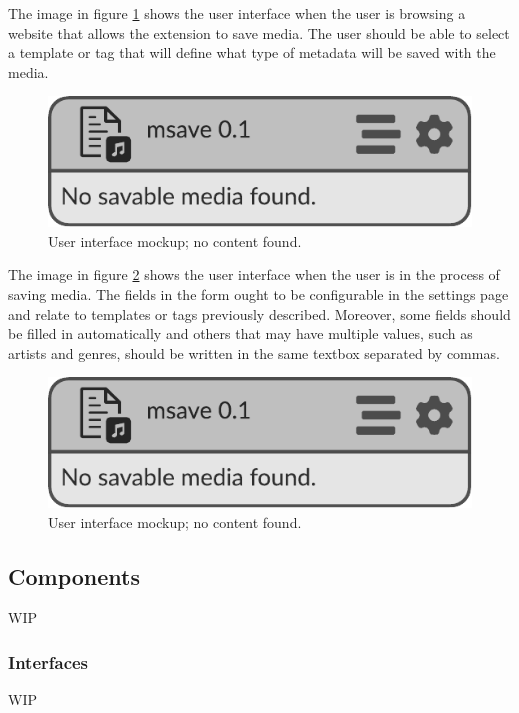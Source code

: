 The image in figure \ref{fig:ui-mockup-2} shows the user interface 
when the user is browsing a website that allows the extension to save media.
The user should be able to select a template or tag that will define 
what type of metadata will be saved with the media.
\begin{figure}[H]
    \centering
    \includegraphics[page=3]{resources/mockup-v0.1.pdf}
    \caption{User interface mockup; no content found.}
\label{fig:ui-mockup-2}
\end{figure}



The image in figure \ref{fig:ui-mockup-3} shows the user interface 
when the user is in the process of saving media.
The fields in the form ought to be configurable in the settings page and relate to templates or tags previously described.
Moreover, some fields should be filled in automatically and others that may have multiple values, such as artists and genres, 
should be written in the same textbox separated by commas.
\begin{figure}[H]
    \centering
    \includegraphics[page=4]{resources/mockup-v0.1.pdf}
    \caption{User interface mockup; no content found.}
\label{fig:ui-mockup-3}
\end{figure}



\subsection{Components}
WIP

\subsubsection{Interfaces}
WIP





